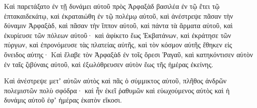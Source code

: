 {\par }{\PP {}Καὶ παρετάξατο ἐν τῇ δυνάμει αὐτοῦ πρὸς Ἀρφαξὰδ βασιλέα ἐν τῷ ἔτει τῷ ἑπτακαιδεκάτῳ, καὶ ἐκραταιώθη ἐν τῷ πολέμῳ αὐτοῦ, καὶ ἀνέστρεψε πᾶσαν τὴν δύναμιν Ἀρφαξὰδ, καὶ πᾶσαν τὴν ἵππον αὐτοῦ, καὶ πάντα τὰ ἅρματα αὐτοῦ,
καὶ ἐκυρίευσε τῶν πόλεων αὐτοῦ· καὶ ἀφίκετο ἕως Ἐκβατάνων, καὶ ἐκράτησε τῶν πύργων, καὶ ἐπρονόμευσε τὰς πλατείας αὐτῆς, καὶ τὸν κόσμον αὐτῆς ἔθηκεν εἰς ὄνειδος αὐτης·
Καὶ ἔλαβε τὸν Ἀρφαξὰδ ἐν τοῖς ὄρεσι Ῥαγαῦ, καὶ κατηκόντισεν αὐτὸν ἐν ταῖς ζιβύναις αὐτοῦ, καὶ ἐξωλόθρευσεν αὐτὸν ἕως τῆς ἡμέρας ἐκείνης.
\par }{\PP {}Καὶ ἀνέστρεψε μετʼ αὐτῶν αὐτὸς καὶ πᾶς ὁ σύμμικτος αὐτοῦ, πλῆθος ἀνδρῶν πολεμιστῶν πολὺ σφόδρα· καὶ ἦν ἐκεῖ ῥαθυμῶν καὶ εὐωχούμενος αὐτὸς καὶ ἡ δυνάμις αὐτοῦ ἐφʼ ἡμέρας ἑκατὸν εἴκοσι.

}
